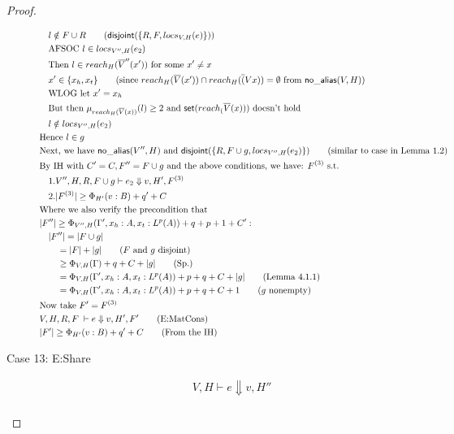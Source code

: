 \documentclass[sigconf]{acmart}
\newcommand{\ms}[1]{\ensuremath{\mathsf{#1}}}
\newcommand{\na}[1]{\mathsf{no\_alias}(#1)}
\newcommand{\dist}[1]{\mathsf{disjoint}(#1)}
\theoremstyle{definition}
\begin{document}
\begin{proof}
\begin{description}
\begin{align*}
  &\quad l \notin F \cup R \tag{$\dist{\{R,F,locs_{V,H}(e)\}}$}\\
  &\quad \text{AFSOC } l \in locs_{V'',H}(e_2)\\
  &\quad \text{Then } l \in reach_H(\overline V'' (x')) \text{ for some } x' \ne x\\
  &\quad x' \in \{x_h,x_t\} \tag{since $reach_H(\overline V (x')) \cap reach_H(\overline (Vx)) = \emptyset$ from $\na{V,H}$}\\
  &\quad \text{WLOG let } x' = x_h\\
  &\quad \text{But then } \mu_{reach_H(\overline V(x))}(l) \ge 2 \text{ and } \ms{set}(reach_(\overline V(x))) \text{ doesn't hold}\\
  &\quad l \notin locs_{V'',H}(e_2)\\
  &\text{Hence } l \in g\\
	&\text{Next, we have } \na{V'',H} \text{ and } \dist{\{R,F \cup g,locs_{V'',H}(e_2)\}} \tag{similar to case in Lemma 1.2}\\
	&\text{By IH with } C' = C, F'' = F \cup g \text{ and the above conditions, we have: } F^{(3)} \text{ s.t.}\\
	&\quad 1. V'',H,R,F\cup g \vdash e_2 \Downarrow v,H',F^{(3)}\\
	&\quad 2. |F^{(3)}| \ge \Phi_{H'}(v:B) + q' + C\\
	&\text{Where we also verify the precondition that }\\
	&|F''| \ge \Phi_{V'',H}(\Gamma',x_h:A,x_t:L^p(A)) + q + p + 1 + C':\\
	&\quad |F''| = |F \cup g|\\
	&\quad \quad = |F| + |g| \tag{$F$ and $g$ disjoint}\\
	&\quad \quad \ge \Phi_{V,H}(\Gamma) + q + C + |g| \tag{Sp.}\\
	&\quad \quad = \Phi_{V,H}(\Gamma',x_h:A,x_t:L^p(A)) + p + q + C + |g| \tag{Lemma 4.1.1}\\
	&\quad \quad = \Phi_{V,H}(\Gamma',x_h:A,x_t:L^p(A)) + p + q + C + 1 \tag{$g$ nonempty}\\
	&\text{Now take } F' = F^{(3)}\\
	&V,H,R,F \; \vdash e \Downarrow v,H',F' \tag{E:MatCons}\\
  &|F'| \ge \Phi_{H'}(v:B) + q' + C \tag{From the IH}\\
  \end{align*}
  \item[Case 13: E:Share]
	\begin{align*}
	&V,H \vdash e \Downarrow v,H'' \tag{case}\\

\end{align*}
\end{description}
\end{proof}
\end{document}
